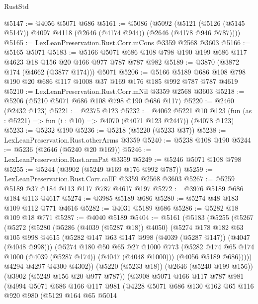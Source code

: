 \begin{lexlean}{RustStd}
\begin{coremodule}
@5147 := @4056 @5071 @686
@5161 := @5086
    (@5092 (@5121 (@5126 (@5145 @5147)) @4097 @4118 (@2646 (@4174 @944)) (@2646 (@4178 @946 @787))))
@5165 := LexLeanPreservation.Rust.Corr.mCons @3359 @2568 @3603
@5166 := @5165 @5071
@5183 := @5166 @5071 @686 @108 @798 @190 @199 @686 @117 @4623 @18 @156 @20 @166 @977 @787 @787 @982
@5189 := @3870 (@3872 @174 (@4662 (@3877 @174))) @5071
@5206 := @5166 @5189 @686 @108 @798 @190 @20 @686 @117 @1008 @37 @169 @176 @185 @992 @787 @787 @4619
@5210 := LexLeanPreservation.Rust.Corr.mNil @3359 @2568 @3603
@5218 := @5206 (@5210 @5071 @686 @108 @798 @190 @686 @117)
@5220 := @2460 (@2432 @123)
@5221 := @2375 @123
@5232 := @4062
    @5221
    @10
    @123
    (fun (as : @5221) => fun (i : @10) => @4070 (@4071 @123 @2447))
    (@4078 @123)
@5233 := @5232 @190
@5236 := @5218 (@5220 (@5233 @37))
@5238 := LexLeanPreservation.Rust.otherArms @3359
@5240 := @5238 @108 @190
@5244 := @5236 (@2646 (@5240 @20 @169))
@5246 := LexLeanPreservation.Rust.armPat @3359
@5249 := @5246 @5071 @108 @798
@5255 := @5244 (@3902 (@5249 @169 @176 @992 @787))
@5259 := LexLeanPreservation.Rust.Corr.callF @3359 @2568 @3603
@5267 := @5259 @5189 @37 @184 @113 @117 @787 @4617 @197
@5272 := @3976 @5189 @686 @184 @113 @4617
@5274 := @3985 @5189 @686
@5280 := @5274 @48 @183 @109 @112 @771 @4616
@5282 := @4031 @5189 @686
@5286 := @5282 @18 @109 @18 @771
@5287 := @4040 @5189
@5404 := @5161
    (@5183
      (@5255
        (@5267
          (@5272
            (@5280
              (@5286 (@4039 (@5287 @18)) @4050)
              (@5274
                @178
                @182
                @63
                @105
                @998
                @4615
                (@5282 @147 @63 @147 @998 (@4039 (@5287 @147)) (@4047 (@4048 @998)))
                (@5274
                  @180
                  @50
                  @65
                  @27
                  @1000
                  @773
                  (@5282 @174 @65 @174 @1000 (@4039 (@5287 @174)) (@4047 (@4048 @1000)))
                  (@4056 @5189 @686)))))
          @4294
          @4297
          @4300
          @4302))
      (@5220 (@5233 @18))
      (@2646 (@5240 @199 @156))
      (@3902 (@5249 @156 @20 @977 @787))
      (@3908
        @5071
        @166
        @117
        @787
        @981
        (@4994
          @5071
          @686
          @166
          @117
          @981
          (@4228
            @5071
            @686
            @130
            @162
            @65
            @116
            @920
            @980
            (@5129
              @164
              @65
              @5014

\end{coremodule}
\end{lexlean}
